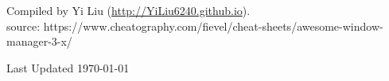 \documentclass[12pt,landscape]{article}
\begin{document}
\begin{multicols*}{3}
\vfill
\columnbreak

\scriptsize

Compiled by Yi Liu (\url{http://YiLiu6240.github.io}). \\
source:
https://www.cheatography.com/fievel/cheat-sheets/awesome-window-manager-3-x/ \\
\begin{center}
    Last Updated \today
\end{center}

\end{multicols*}
\end{document}
